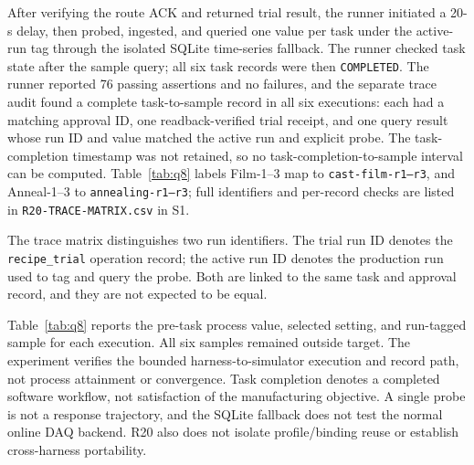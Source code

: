 After verifying the route ACK and returned trial result, the runner initiated
a 20-s delay, then probed, ingested, and queried one value per task under the
active-run tag through the isolated SQLite time-series fallback. The runner
checked task state after the sample query; all six task records were then
\texttt{COMPLETED}. The runner reported 76 passing assertions and no failures, and
the separate trace audit found a complete task-to-sample record in all six
executions: each had a matching approval ID, one readback-verified trial
receipt, and one query result whose run ID and value matched the active run and
explicit probe. The task-completion timestamp was not retained, so no
task-completion-to-sample interval can be computed. Table~\ref{tab:q8} labels
Film-1--3 map to \texttt{cast-film-r1--r3}, and Anneal-1--3 to
\texttt{annealing-r1--r3}; full identifiers and per-record checks are listed
in \texttt{R20-TRACE-MATRIX.csv} in S1.

The trace matrix distinguishes two run identifiers. The trial run ID denotes
the \texttt{recipe\_trial} operation record; the active run ID denotes the
production run used to tag and query the probe. Both are linked to the same
task and approval record, and they are not expected to be equal.

Table~\ref{tab:q8} reports the pre-task process value, selected setting, and
run-tagged sample for each execution. All six samples remained outside target.
The experiment verifies the bounded harness-to-simulator execution and record
path, not process attainment or convergence. Task completion denotes a
completed software workflow, not satisfaction of the manufacturing objective.
A single probe is not a response trajectory, and the SQLite fallback does not
test the normal online DAQ backend. R20 also does not isolate
profile/binding reuse or establish cross-harness portability.

